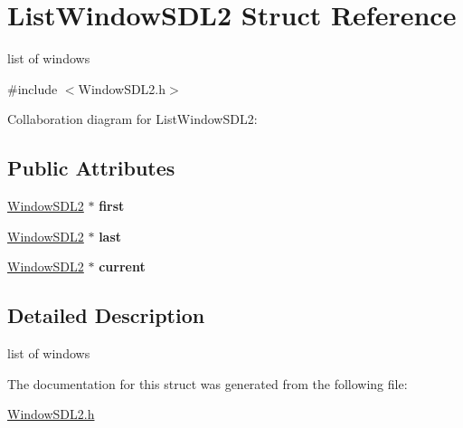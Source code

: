 \hypertarget{structListWindowSDL2}{}\section{List\+Window\+S\+D\+L2 Struct Reference}
\label{structListWindowSDL2}


list of windows  




{\ttfamily \#include $<$Window\+S\+D\+L2.\+h$>$}



Collaboration diagram for List\+Window\+S\+D\+L2\+:
\subsection*{Public Attributes}
\begin{DoxyCompactItemize}
\item 
\hyperlink{structWindowSDL2}{Window\+S\+D\+L2} $\ast$ {\bfseries first}\hypertarget{structListWindowSDL2_aa97229f3f9f48a602b2a96bfc1bb2bf9}{}\label{structListWindowSDL2_aa97229f3f9f48a602b2a96bfc1bb2bf9}

\item 
\hyperlink{structWindowSDL2}{Window\+S\+D\+L2} $\ast$ {\bfseries last}\hypertarget{structListWindowSDL2_ae71123501af1a866d08d4eab4b026b41}{}\label{structListWindowSDL2_ae71123501af1a866d08d4eab4b026b41}

\item 
\hyperlink{structWindowSDL2}{Window\+S\+D\+L2} $\ast$ {\bfseries current}\hypertarget{structListWindowSDL2_a221c8512f5669c9ec3f5450b139a3493}{}\label{structListWindowSDL2_a221c8512f5669c9ec3f5450b139a3493}

\end{DoxyCompactItemize}


\subsection{Detailed Description}
list of windows 

The documentation for this struct was generated from the following file\+:\begin{DoxyCompactItemize}
\item 
\hyperlink{WindowSDL2_8h}{Window\+S\+D\+L2.\+h}\end{DoxyCompactItemize}
